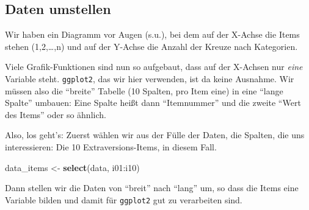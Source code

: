 \documentclass[12pt,]{book}
\newenvironment{Shaded}{\begin{snugshade}}{\end{snugshade}}
\newcommand{\KeywordTok}[1]{\textcolor[rgb]{0.13,0.29,0.53}{\textbf{{#1}}}}
\newcommand{\DataTypeTok}[1]{\textcolor[rgb]{0.13,0.29,0.53}{{#1}}}
\newcommand{\StringTok}[1]{\textcolor[rgb]{0.31,0.60,0.02}{{#1}}}
\newcommand{\CommentTok}[1]{\textcolor[rgb]{0.56,0.35,0.01}{\textit{{#1}}}}
\newcommand{\NormalTok}[1]{{#1}}
\begin{document}
\begin{Shaded}
\end{Shaded}

\subsection{Daten umstellen}\label{daten-umstellen}

Wir haben ein Diagramm vor Augen (s.u.), bei dem auf der X-Achse die
Items stehen (1,2,\ldots{},n) und auf der Y-Achse die Anzahl der Kreuze
nach Kategorien.

Viele Grafik-Funktionen sind nun so aufgebaut, dass auf der X-Achsen nur
\emph{eine} Variable steht. \texttt{ggplot2}, das wir hier verwenden,
ist da keine Ausnahme. Wir müssen also die ``breite'' Tabelle (10
Spalten, pro Item eine) in eine ``lange Spalte'' umbauen: Eine Spalte
heißt dann ``Itemnummer'' und die zweite ``Wert des Items'' oder so
ähnlich.

Also, los geht's: Zuerst wählen wir aus der Fülle der Daten, die
Spalten, die uns interessieren: Die 10 Extraversions-Items, in diesem
Fall.

\begin{Shaded}
\begin{Highlighting}[]
\NormalTok{data_items <-}\StringTok{ }\KeywordTok{select}\NormalTok{(data, i01:i10)}
\end{Highlighting}
\end{Shaded}

Dann stellen wir die Daten von ``breit'' nach ``lang'' um, so dass die
Items eine Variable bilden und damit für \texttt{ggplot2} gut zu
verarbeiten sind.

\begin{Shaded}
\end{Shaded}
\end{document}
